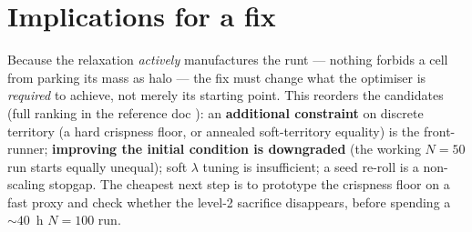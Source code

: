 \documentclass[11pt,a4paper]{article}
\begin{document}
\section{Implications for a fix}
\label{sec:implications}
Because the relaxation \emph{actively} manufactures the runt --- nothing forbids a
cell from parking its mass as halo --- the fix must change what the optimiser is
\emph{required} to achieve, not merely its starting point. This reorders the
candidates (full ranking in the reference doc ):
an \textbf{additional constraint} on discrete territory (a hard crispness floor, or
annealed soft-territory equality) is the front-runner; \textbf{improving the
initial condition is downgraded} (the working \(N=50\) run starts equally unequal);
soft \(\lambda\) tuning is insufficient; a seed re-roll is a non-scaling stopgap.
The cheapest next step is to prototype the crispness floor on a fast proxy and
check whether the level-2 sacrifice disappears, before spending a \(\sim 40\)~h
\(N=100\) run.
\end{document}
